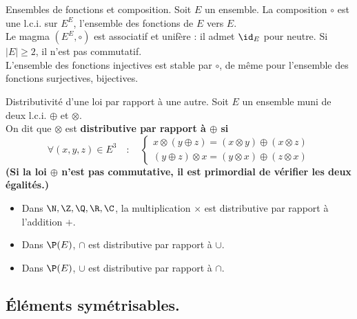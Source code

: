 \documentclass[11pt]{article}
\begin{document}
\vspace*{-0.1cm}

\begin{ex}{Ensembles de fonctions et composition.}{}
    Soit $E$ un ensemble. La composition $\circ$ est une l.c.i. sur $E^E$, l'ensemble des fonctions de $E$ vers $E$.\\
    Le magma $(E^E,\circ)$ est associatif et unifère : il admet $\id_E$ pour neutre. Si $|E|\geq2$, il n'est pas commutatif.\\
    L'ensemble des fonctions injectives est stable par $\circ$, de même pour l'ensemble des fonctions surjectives, bijectives.
\end{ex}

\vspace*{-0.1cm}

\begin{defi}{Distributivité d'une loi par rapport à une autre.}{}
    Soit $E$ un ensemble muni de deux l.c.i. $\oplus$ et $\otimes$.\\
    On dit que $\otimes$ est \bf{distributive par rapport à} $\oplus$ si
    \begin{equation*}
        \forall (x,y,z)\in E^3 \quad : \quad \begin{cases}
            x \otimes (y \oplus z) = (x \otimes y) \oplus (x \otimes z)\\
            (y \oplus z) \otimes x = (y \otimes x) \oplus (z \otimes x)
        \end{cases}
    \end{equation*}
    (Si la loi $\oplus$ n'est pas commutative, il est primordial de vérifier les deux égalités.)
\end{defi}

\begin{ex}{}{}
    \begin{itemize}
        \item Dans $\N,\Z,\Q,\R,\C$, la multiplication $\times$ est distributive par rapport à l'addition $+$.
        \item Dans $\P(E)$, $\cap$ est distributive par rapport à $\cup$.
        \item Dans $\P(E)$, $\cup$ est distributive par rapport à $\cap$.
    \end{itemize}
\end{ex}

\subsection{Éléments symétrisables.}
\end{document}
